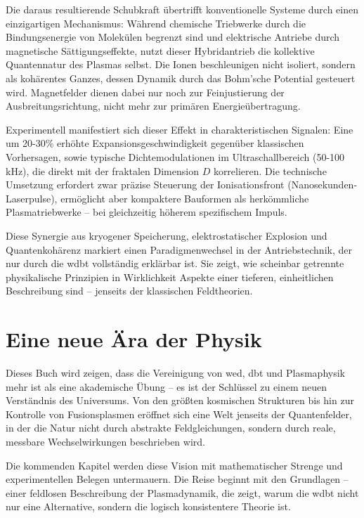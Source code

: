 Die daraus resultierende Schubkraft übertrifft konventionelle Systeme durch einen einzigartigen Mechanismus: Während chemische Triebwerke durch die Bindungsenergie von Molekülen begrenzt sind und
elektrische Antriebe durch magnetische Sättigungseffekte, nutzt dieser Hybridantrieb die kollektive Quantennatur des Plasmas selbst. Die Ionen beschleunigen nicht isoliert, sondern als kohärentes
Ganzes, dessen Dynamik durch das Bohm'sche Potential gesteuert wird. Magnetfelder dienen dabei nur noch zur Feinjustierung der Ausbreitungsrichtung, nicht mehr zur primären Energieübertragung.

Experimentell manifestiert sich dieser Effekt in charakteristischen Signalen: Eine um 20-30\% erhöhte Expansionsgeschwindigkeit gegenüber klassischen Vorhersagen, sowie typische Dichtemodulationen
im Ultraschallbereich (50-100 kHz), die direkt mit der fraktalen Dimension $D$ korrelieren. Die technische Umsetzung erfordert zwar präzise Steuerung der Ionisationsfront (Nanosekunden-Laserpulse),
ermöglicht aber kompaktere Bauformen als herkömmliche Plasmatriebwerke – bei gleichzeitig höherem spezifischem Impuls.

Diese Synergie aus kryogener Speicherung, elektrostatischer Explosion und Quantenkohärenz markiert einen Paradigmenwechsel in der Antriebstechnik, der nur durch die \gls{wdbt} vollständig erklärbar
ist. Sie zeigt, wie scheinbar getrennte physikalische Prinzipien in Wirklichkeit Aspekte einer tieferen, einheitlichen Beschreibung sind – jenseits der klassischen Feldtheorien.

\section{Eine neue Ära der Physik}
Dieses Buch wird zeigen, dass die Vereinigung von \gls{wed}, \gls{dbt} und Plasmaphysik mehr ist als eine akademische Übung – es ist der Schlüssel zu
einem neuen Verständnis des Universums. Von den größten kosmischen Strukturen bis hin zur Kontrolle von Fusionsplasmen eröffnet sich eine Welt jenseits der Quantenfelder, in der
die Natur nicht durch abstrakte Feldgleichungen, sondern durch reale, messbare Wechselwirkungen beschrieben wird.

Die kommenden Kapitel werden diese Vision mit mathematischer Strenge und experimentellen Belegen untermauern. Die Reise beginnt mit den Grundlagen – einer feldlosen Beschreibung
der Plasmadynamik, die zeigt, warum die \gls{wdbt} nicht nur eine Alternative, sondern die logisch konsistentere Theorie ist.
